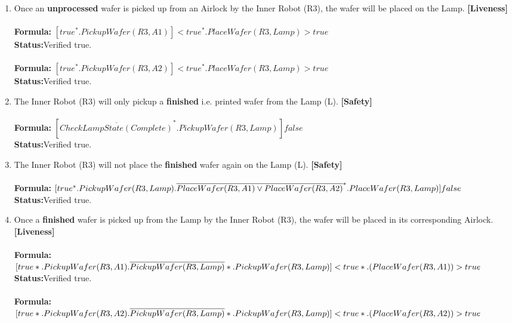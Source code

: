 \documentclass[a4paper,12pt]{article}
\begin{document}
\begin{enumerate}
		
		\item Once an \textbf{unprocessed} wafer is picked up from an Airlock by the Inner Robot (R3), the wafer will be placed on the Lamp. \textbf{[Liveness]}
		\\
		\\\textbf{Formula:} $[true^*.PickupWafer(R3,A1)]<true^*.PlaceWafer(R3,Lamp)>true$ \\\textbf{Status:}Verified true.
		\\
		\\\textbf{Formula:} $[true^*.PickupWafer(R3,A2)] <true^*.PlaceWafer(R3,Lamp)>true$ \\\textbf{Status:}Verified true.
		\item The Inner Robot (R3) will only pickup a \textbf{finished} i.e. printed wafer from the Lamp (L). \textbf{[Safety]}
		\\
		\\\textbf{Formula:} $[ \overline{CheckLampState(Complete)}^*.PickupWafer(R3,Lamp)]  false$ 
		\\\textbf{Status:}Verified true.
		\item The Inner Robot (R3) will not place the \textbf{finished} wafer again on the Lamp (L). \textbf{[Safety]}
		\\
		\\\textbf{Formula:} $[true^*.PickupWafer(R3,Lamp).
		\\ \overline{PlaceWafer(R3,A1) \vee PlaceWafer(R3,A2)}^*.PlaceWafer(R3,Lamp)] false$ \\\textbf{Status:}Verified true.
		\item Once a \textbf{finished} wafer is picked up from the Lamp by the Inner Robot (R3), the wafer will be placed in its corresponding Airlock. \textbf{[Liveness]}
		\\
		\\\textbf{Formula:} $[true*.PickupWafer(R3,A1).\overline{PickupWafer(R3,Lamp)}*.\\PickupWafer(R3, Lamp)] <true*.(PlaceWafer(R3, A1))> true$
		\\\textbf{Status:}Verified true.
		\\
		\\\textbf{Formula:} $[true*.PickupWafer(R3,A2).\overline{PickupWafer(R3,Lamp)}*.\\PickupWafer(R3, Lamp)] <true*.(PlaceWafer(R3, A2))> true$

\end{enumerate}
\end{document}
